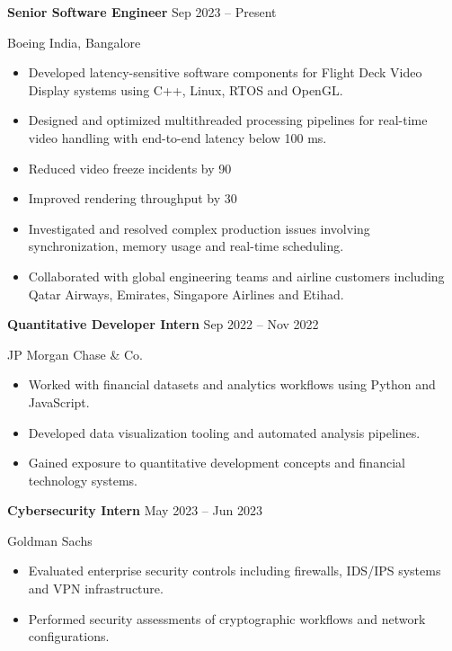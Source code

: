 \documentclass[letterpaper,11pt]{article}
\begin{document}
\textbf{Senior Software Engineer} \hfill Sep 2023 -- Present

Boeing India, Bangalore

\begin{itemize}[leftmargin=*]
\item Developed latency-sensitive software components for Flight Deck Video Display systems using C++, Linux, RTOS and OpenGL.
\item Designed and optimized multithreaded processing pipelines for real-time video handling with end-to-end latency below 100 ms.
\item Reduced video freeze incidents by 90%
\item Improved rendering throughput by 30%
\item Investigated and resolved complex production issues involving synchronization, memory usage and real-time scheduling.
\item Collaborated with global engineering teams and airline customers including Qatar Airways, Emirates, Singapore Airlines and Etihad.
\end{itemize}

\textbf{Quantitative Developer Intern} \hfill Sep 2022 -- Nov 2022

JP Morgan Chase & Co.

\begin{itemize}[leftmargin=*]
\item Worked with financial datasets and analytics workflows using Python and JavaScript.
\item Developed data visualization tooling and automated analysis pipelines.
\item Gained exposure to quantitative development concepts and financial technology systems.
\end{itemize}

\textbf{Cybersecurity Intern} \hfill May 2023 -- Jun 2023

Goldman Sachs

\begin{itemize}[leftmargin=*]
\item Evaluated enterprise security controls including firewalls, IDS/IPS systems and VPN infrastructure.
\item Performed security assessments of cryptographic workflows and network configurations.
\end{itemize}
\end{document}
